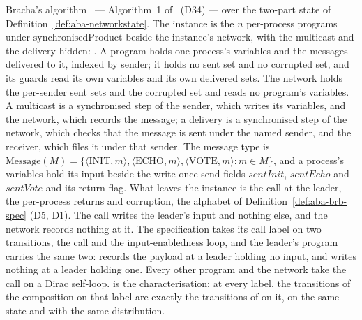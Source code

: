 \begin{definition}
  \label{def:aba-bracha-implementation}
  \leanok
  Bracha's algorithm~\cite{Bra87} --- Algorithm~1 of~\cite{AFW25} (D34) --- over the two-part state of Definition~\ref{def:aba-networkstate}.
  The instance is the $n$ per-process programs under $\mathrm{synchronisedProduct}$ beside the instance's network, with the multicast and the delivery hidden: .
  A program holds one process's variables and the messages delivered to it, indexed by sender; it holds no sent set and no corrupted set, and its guards read its own variables and its own delivered sets.
  The network holds the per-sender sent sets and the corrupted set and reads no program's variables.
  A multicast is a synchronised step of the sender, which writes its variables, and the network, which records the message; a delivery is a synchronised step of the network, which checks that the message is sent under the named sender, and the receiver, which files it under that sender.
  The message type is $\mathrm{Message}(M) = \{\langle\mathrm{INIT}, m\rangle, \langle\mathrm{ECHO}, m\rangle, \langle\mathrm{VOTE}, m\rangle : m \in M\}$, and a process's variables hold its input beside the write-once send fields $\mathit{sentInit}$, $\mathit{sentEcho}$ and $\mathit{sentVote}$ and its return flag.
  What leaves the instance is the call at the leader, the per-process returns and corruption, the alphabet of Definition~\ref{def:aba-brb-spec} (D5, D1).
  The call writes the leader's input and nothing else, and the network records nothing at it.
  The specification takes its call label on two transitions, the call and the input-enabledness loop, and the leader's program carries the same two:  records the payload at a leader holding no input, and  writes nothing at a leader holding one.
  Every other program and the network take the call on a Dirac self-loop.
   is the characterisation: at every label, the transitions of the composition on that label are exactly the transitions of  on it, on the same state and with the same distribution.

\end{definition}
